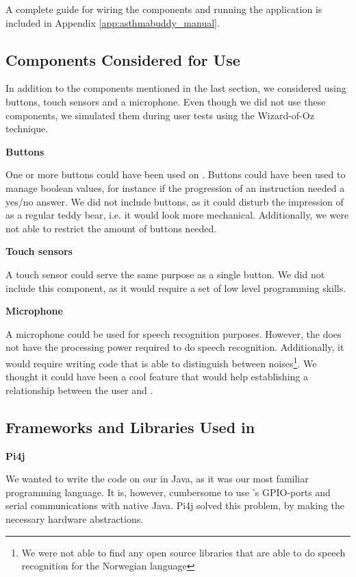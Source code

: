 A complete guide for wiring the components and running the application is included in Appendix \ref{app:asthmabuddy_manual}.

\subsection{Components Considered for Use}
\label{sec:componentsconsidered}
In addition to the components mentioned in the last section, we considered using buttons, touch sensors and a microphone. Even though we did not use these components, we simulated them during user tests using the Wizard-of-Oz technique. 

\textbf{Buttons}

One or more buttons could have been used on \ab{}. Buttons could have been used to manage boolean values, for instance if the progression of an instruction needed a yes/no answer. We did not include buttons, as it could disturb the impression of \ab{} as a regular teddy bear, i.e. it would look more mechanical. Additionally, we were not able to restrict the amount of buttons needed. 

\textbf{Touch sensors}

A touch sensor could serve the same purpose as a single button. We did not include this component, as it would require a set of low level programming skills. 

\textbf{Microphone}

A microphone could be used for speech recognition purposes. However, the \rpi{} does not have the processing power required to do speech recognition. Additionally, it would require writing code that is able to distinguish between noises\footnote{We were not able to find any open source libraries that are able to do speech recognition for the Norwegian language}. We thought it could have been a cool feature that would help establishing a relationship between the user and \ab{}.    

\subsection{Frameworks and Libraries Used in \ab{}} 

\textbf{Pi4j}

We wanted to write the code on our \rpi{} in Java, as it was our most familiar programming language. It is, however, cumbersome to use \rpi{}'s GPIO-ports and serial communications with native Java. Pi4j solved this problem, by making the necessary hardware abstractions.

